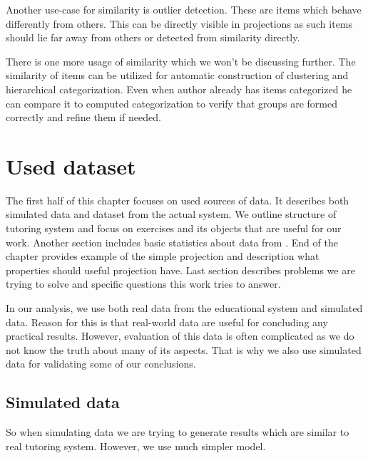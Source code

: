 \documentclass[
  digital, %
  table,   %
  nolof,     %
  nolot,     %
  nocover,
  color,
  final, %
]{fithesis3}
\begin{document}
Another use-case for similarity is outlier detection. These are items which behave differently from others. This can be directly visible in projections as such items should lie far away from others or detected from similarity directly.

There is one more usage of similarity which we won't be discussing further. The similarity of items can be utilized for automatic construction of clustering and hierarchical categorization. Even when author already has items categorized he can compare it to computed categorization to verify that groups are formed correctly and refine them if needed.


\chapter{Used dataset}\label{used-dataset}


The first half of this chapter focuses on used sources of data. It describes both simulated data and dataset from the actual system. We outline structure of tutoring system and focus on exercises and its objects that are useful for our work. Another section includes basic statistics about data from \umimeCesky{}. End of the chapter provides example of the simple projection and description what properties should useful projection have. Last section describes problems we are trying to solve and specific questions this work tries to answer.


In our analysis, we use both real data from the educational system and simulated data. Reason for this is that real-world data are useful for concluding any practical results. However, evaluation of this data is often complicated as we do not know the truth about many of its aspects. That is why we also use simulated data for validating some of our conclusions.


\section{Simulated data}\label{simulated-data}

So when simulating data we are trying to generate results which are similar to real tutoring system. However, we use much simpler model.
\end{document}
